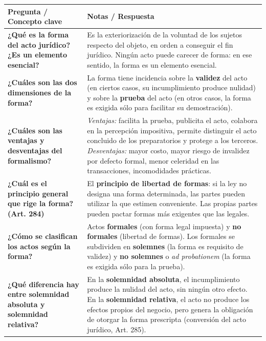 \documentclass[12pt,oneside]{book}
\begin{document}
\begin{table}[H]
\centering
\begin{tabularx}{\textwidth}{
    >{\raggedright\arraybackslash}p{}
    >{\raggedright\arraybackslash}X
}
\toprule
\textbf{Pregunta / Concepto clave} &
\textbf{Notas / Respuesta} \\
\midrule

\textbf{¿Qué es la forma del acto jurídico? ¿Es un elemento esencial?} &
Es la exteriorización de la voluntad de los sujetos respecto del objeto, en orden a conseguir el fin jurídico. Ningún acto puede carecer de forma: en ese sentido, la forma es un elemento esencial. \\[6pt]

\textbf{¿Cuáles son las dos dimensiones de la forma?} &
La forma tiene incidencia sobre la \textbf{validez} del acto (en ciertos casos, su incumplimiento produce nulidad) y sobre la \textbf{prueba} del acto (en otros casos, la forma es exigida sólo para facilitar su demostración). \\[6pt]

\textbf{¿Cuáles son las ventajas y desventajas del formalismo?} &
\textit{Ventajas:} facilita la prueba, publicita el acto, colabora en la percepción impositiva, permite distinguir el acto concluido de los preparatorios y protege a los terceros. \textit{Desventajas:} mayor costo, mayor riesgo de invalidez por defecto formal, menor celeridad en las transacciones, incomodidades prácticas. \\[6pt]

\textbf{¿Cuál es el principio general que rige la forma? (Art. 284)} &
El \textbf{principio de libertad de formas}: si la ley no designa una forma determinada, las partes pueden utilizar la que estimen conveniente. Las propias partes pueden pactar formas más exigentes que las legales. \\[6pt]

\textbf{¿Cómo se clasifican los actos según la forma?} &
Actos \textbf{formales} (con forma legal impuesta) y \textbf{no formales} (libertad de formas). Los formales se subdividen en \textbf{solemnes} (la forma es requisito de validez) y \textbf{no solemnes} o \emph{ad probationem} (la forma es exigida sólo para la prueba). \\[6pt]

\textbf{¿Qué diferencia hay entre solemnidad absoluta y solemnidad relativa?} &
En la \textbf{solemnidad absoluta}, el incumplimiento produce la nulidad del acto, sin ningún otro efecto. En la \textbf{solemnidad relativa}, el acto no produce los efectos propios del negocio, pero genera la obligación de otorgar la forma prescripta (conversión del acto jurídico, Art. 285). \\[6pt]


\end{tabularx}
\end{table}
\end{document}
